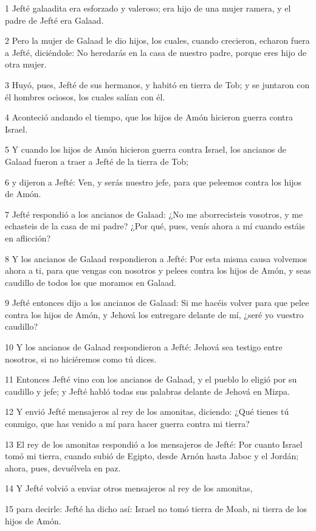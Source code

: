 \par 1 Jefté galaadita era esforzado y valeroso; era hijo de una mujer ramera, y el padre de Jefté era Galaad.
\par 2 Pero la mujer de Galaad le dio hijos, los cuales, cuando crecieron, echaron fuera a Jefté, diciéndole: No heredarás en la casa de nuestro padre, porque eres hijo de otra mujer.
\par 3 Huyó, pues, Jefté de sus hermanos, y habitó en tierra de Tob; y se juntaron con él hombres ociosos, los cuales salían con él.
\par 4 Aconteció andando el tiempo, que los hijos de Amón hicieron guerra contra Israel.
\par 5 Y cuando los hijos de Amón hicieron guerra contra Israel, los ancianos de Galaad fueron a traer a Jefté de la tierra de Tob; 
\par 6 y dijeron a Jefté: Ven, y serás nuestro jefe, para que peleemos contra los hijos de Amón.
\par 7 Jefté respondió a los ancianos de Galaad: ¿No me aborrecisteis vosotros, y me echasteis de la casa de mi padre? ¿Por qué, pues, venís ahora a mí cuando estáis en aflicción?
\par 8 Y los ancianos de Galaad respondieron a Jefté: Por esta misma causa volvemos ahora a ti, para que vengas con nosotros y pelees contra los hijos de Amón, y seas caudillo de todos los que moramos en Galaad.
\par 9 Jefté entonces dijo a los ancianos de Galaad: Si me hacéis volver para que pelee contra los hijos de Amón, y Jehová los entregare delante de mí, ¿seré yo vuestro caudillo?
\par 10 Y los ancianos de Galaad respondieron a Jefté: Jehová sea testigo entre nosotros, si no hiciéremos como tú dices.
\par 11 Entonces Jefté vino con los ancianos de Galaad, y el pueblo lo eligió por su caudillo y jefe; y Jefté habló todas sus palabras delante de Jehová en Mizpa.
\par 12 Y envió Jefté mensajeros al rey de los amonitas, diciendo: ¿Qué tienes tú conmigo, que has venido a mí para hacer guerra contra mi tierra?
\par 13 El rey de los amonitas respondió a los mensajeros de Jefté: Por cuanto Israel tomó mi tierra, cuando subió de Egipto, desde Arnón hasta Jaboc y el Jordán; ahora, pues, devuélvela en paz.
\par 14 Y Jefté volvió a enviar otros mensajeros al rey de los amonitas,
\par 15 para decirle: Jefté ha dicho así: Israel no tomó tierra de Moab, ni tierra de los hijos de Amón.
